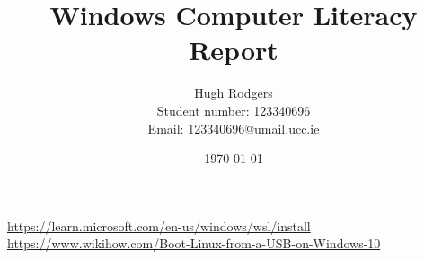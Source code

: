 \documentclass[a4paper,11pt]{article}
\title{Windows Computer Literacy Report}
\author{Hugh Rodgers \\ Student number: 123340696 \\ Email: 123340696@umail.ucc.ie}
\date{\today}
\begin{document}
\maketitle

\tableofcontents
\newpage
\url{https://learn.microsoft.com/en-us/windows/wsl/install}
\url{https://www.wikihow.com/Boot-Linux-from-a-USB-on-Windows-10}
\end{document}
